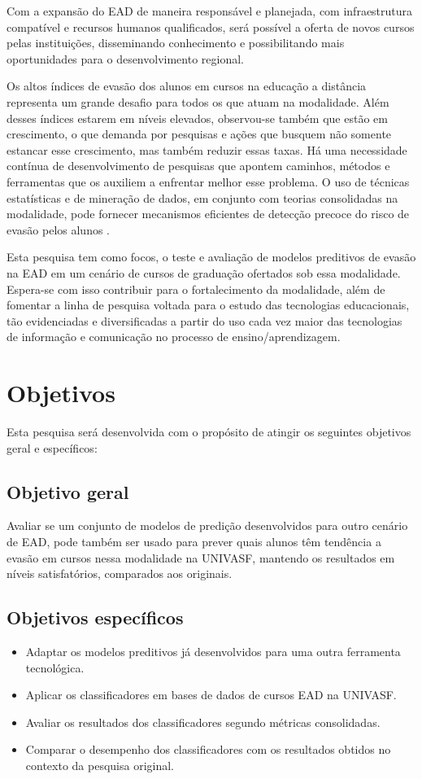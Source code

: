 Com a expansão do EAD de maneira responsável e planejada, com infraestrutura
compatível e recursos humanos qualificados, será possível a oferta de novos
cursos pelas instituições, disseminando conhecimento e possibilitando mais
oportunidades para o desenvolvimento regional.

Os altos índices de evasão dos alunos em cursos na educação a distância
representa um grande desafio para todos os que atuam na modalidade. Além desses
índices estarem em níveis elevados, observou-se também que estão em crescimento,
o que demanda por pesquisas e ações que busquem não somente estancar esse
crescimento, mas também reduzir essas taxas. Há uma necessidade contínua de
desenvolvimento de pesquisas que apontem caminhos, métodos e ferramentas que os
auxiliem a enfrentar melhor esse problema. O uso de técnicas estatísticas e de
mineração de dados, em conjunto com teorias consolidadas na modalidade, pode
fornecer mecanismos eficientes de detecção precoce do risco de evasão pelos
alunos \cite{ramos2016abordagem}.

Esta pesquisa tem como focos, o teste e avaliação de modelos preditivos de
evasão na EAD em um cenário de cursos de graduação ofertados sob essa
modalidade. Espera-se com isso contribuir para o fortalecimento da modalidade,
além de fomentar a linha de pesquisa voltada para o estudo das tecnologias
educacionais, tão evidenciadas e diversificadas a partir do uso cada vez maior
das tecnologias de informação e comunicação no processo de ensino/aprendizagem.


\section{Objetivos}

Esta pesquisa será desenvolvida com o propósito de atingir os seguintes
objetivos geral e específicos:

\subsection{Objetivo geral}

Avaliar se um conjunto de modelos de predição desenvolvidos para outro cenário
de EAD, pode também ser usado para prever quais alunos têm tendência a evasão em
cursos nessa modalidade na UNIVASF, mantendo os resultados em níveis
satisfatórios, comparados aos originais.

\subsection{Objetivos específicos}
\begin{itemize}
  \item Adaptar os modelos preditivos já desenvolvidos para uma outra ferramenta
  tecnológica.
  \item Aplicar os classificadores em bases de dados de cursos EAD na UNIVASF.
  \item Avaliar os resultados dos classificadores segundo métricas consolidadas.
  \item Comparar o desempenho dos classificadores com os resultados obtidos no
  contexto da pesquisa original.
\end{itemize}
